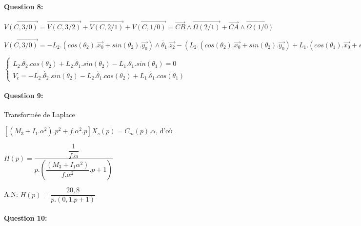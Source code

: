 \paragraph{Question 8:} $\overrightarrow{V(C,3/0)}=\overrightarrow{V(C,3/2)}+\overrightarrow{V(C,2/1)}+\overrightarrow{V(C,1/0)}=\overrightarrow{CB}\wedge \overrightarrow{\Omega(2/1)}+\overrightarrow{CA}\wedge \overrightarrow{\Omega(1/0)}$

$\overrightarrow{V(C,3/0)}=-L_2.(cos(\theta_2).\overrightarrow{x_0}+sin(\theta_2).\overrightarrow{y_0})\wedge \dot{\theta_1}.\overrightarrow{z_2}-(L_2.(cos(\theta_2).\overrightarrow{x_0}+sin(\theta_2).\overrightarrow{y_0})+L_1.(cos(\theta_1).\overrightarrow{x_0}+sin(\theta_1).\overrightarrow{y_0}))\wedge \dot{\theta_1}.\overrightarrow{z_1}$

$\left\{\begin{array}{l} L_2.\dot{\theta_2}.cos(\theta_2)+L_2.\dot{\theta_1}.sin(\theta_2)-L_1.\dot{\theta_1}.sin(\theta_1)=0 \\ V_c=-L_2.\dot{\theta_2}.sin(\theta_2)-L_2.\dot{\theta_1}.cos(\theta_2)+L_1.\dot{\theta_1}.cos(\theta_1)
\end{array}\right.$

\paragraph{Question 9:} Transformée de Laplace

$\left[\left(M_3+I_1.\alpha^2\right).p^2+f.\alpha^2.p\right]X_s(p)=C_m(p).\alpha$, d'où

$H(p)=\dfrac{\dfrac{1}{f.\alpha}}{p.\left(\dfrac{(M_3+I_1\alpha^2)}{f.\alpha^2}.p+1 \right)}$

A.N: $H(p)=\dfrac{20,8}{p.(0,1.p+1)}$

\paragraph{Question 10:} ~\ \\

